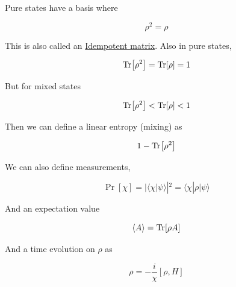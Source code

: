\documentclass{article}
\newtheorem{one minute paper}[theorem]{One Minute Paper}
\begin{document}
Pure states have a basis where 

\begin{equation}
    \rho^2 = \rho
\end{equation}

This is also called an \underline{Idempotent matrix}. Also in pure states, 

\begin{equation}
    \Tr[\rho^2] = \Tr[\rho] =1 
\end{equation}

But for mixed states 

\begin{equation}
    \Tr[\rho^2] < \Tr[\rho] < 1
\end{equation}

Then we can define a linear entropy (mixing) as 

\begin{equation}
    1 - \Tr[\rho^2]
\end{equation}

We can also define measurements, 

\begin{equation}
    \Pr[\chi] = | \langle \chi | \psi \rangle |^2 = \langle \chi | \rho | \psi \rangle
\end{equation}

And an expectation value 

\begin{equation}
    \langle A \rangle = \Tr[\rho A]
\end{equation}

And a time evolution on $\rho$ as 

\begin{equation}
    \rho = -\frac{i}{\chi}[\rho, H]
\end{equation}
\end{document}
